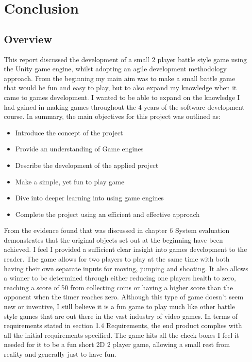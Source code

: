 \chapter{Conclusion}
\section{Overview}
This report discussed the development of a small 2 player battle style game using the Unity game engine, whilst adopting an agile development methodology approach. From the beginning my main aim was to make a small battle game that would be fun and easy to play, but to also expand my knowledge when it came to games development. I wanted to be able to expand on the knowledge I had gained in making games throughout the 4 years of the software development course. In summary, the main objectives for this project was outlined as:
\newline
\begin{itemize}
\item Introduce the concept of the project
\item Provide an understanding of Game engines
\item Describe the development of the applied project
\item Make a simple, yet fun to play game
\item Dive into deeper learning into using game engines
\item Complete the project using an efficient and effective approach
\end{itemize}

From the evidence found that was discussed in chapter 6 System evaluation demonstrates that the original objects set out at the beginning have been achieved. I feel I provided a sufficient clear insight into games development to the reader.
The game allows for two players to play at the same time with both having their own separate inputs for moving, jumping and shooting. It also allows a winner to be determined through either reducing one players health to zero, reaching a score of 50 from collecting coins or having a higher score than the opponent when the timer reaches zero. Although this type of game doesn't seem new or inventive, I still believe it is a fun game to play much like other battle style games that are out there in the vast industry of video games.
\newline
In terms of requirements stated in section 1.4 Requirements, the end product complies with all the initial requirements specified. The game hits all the check boxes I feel it needed for it to be a fun short 2D 2 player game, allowing a small rest from reality and generally just to have fun.

